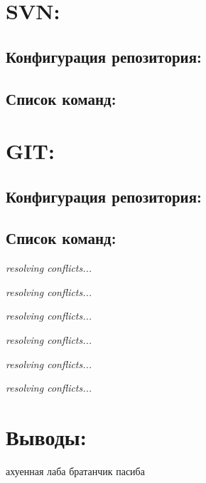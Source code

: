\section{SVN:}
\subsection{Конфигурация репозитория:}

\subsection{Список команд:}


\newpage
\thispagestyle{empty}
\BgThispage
\section{GIT:}
\subsection{Конфигурация репозитория:}

\subsection{Список команд:}

\textit{resolving conflicts...}

\textit{resolving conflicts...}

\textit{resolving conflicts...}

\textit{resolving conflicts...}

\textit{resolving conflicts...}

\textit{resolving conflicts...}


\section{Выводы:}
ахуенная лаба братанчик пасиба
